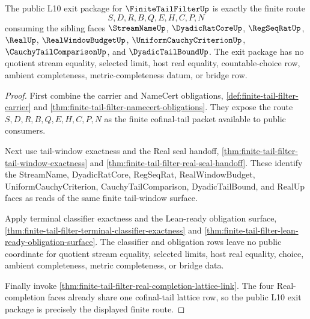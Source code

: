 \begin{theorem}
\label{thm:finite-tail-filter-public-exit-package}
The public L10 exit package for $\FiniteTailFilterUp$ is exactly the finite route
$$
S,D,R,B,Q,E,H,C,P,N
$$
consuming the sibling faces $\StreamNameUp$, $\DyadicRatCoreUp$, $\RegSeqRatUp$, $\RealUp$, $\RealWindowBudgetUp$, $\UniformCauchyCriterionUp$, $\CauchyTailComparisonUp$, and $\DyadicTailBoundUp$. The exit package has no quotient stream equality, selected limit, host real equality, countable-choice row, ambient completeness, metric-completeness datum, or bridge row.
\end{theorem}
\begin{proof}
First combine the carrier and NameCert obligations, \autoref{def:finite-tail-filter-carrier} and \autoref{thm:finite-tail-filter-namecert-obligations}. They expose the route $S,D,R,B,Q,E,H,C,P,N$ as the finite cofinal-tail packet available to public consumers.

Next use tail-window exactness and the Real seal handoff, \autoref{thm:finite-tail-filter-tail-window-exactness} and \autoref{thm:finite-tail-filter-real-seal-handoff}. These identify the StreamName, DyadicRatCore, RegSeqRat, RealWindowBudget, UniformCauchyCriterion, CauchyTailComparison, DyadicTailBound, and RealUp faces as reads of the same finite tail-window surface.

Apply terminal classifier exactness and the Lean-ready obligation surface, \autoref{thm:finite-tail-filter-terminal-classifier-exactness} and \autoref{thm:finite-tail-filter-lean-ready-obligation-surface}. The classifier and obligation rows leave no public coordinate for quotient stream equality, selected limits, host real equality, choice, ambient completeness, metric completeness, or bridge data.

Finally invoke \autoref{thm:finite-tail-filter-real-completion-lattice-link}. The four Real-completion faces already share one cofinal-tail lattice row, so the public L10 exit package is precisely the displayed finite route.
\end{proof}


